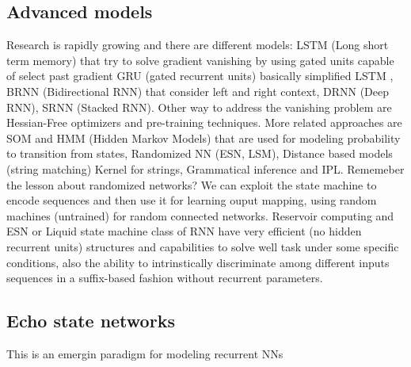 \documentclass[12pt]{book}
\begin{document}
\subsection{Advanced models}
Research is rapidly growing and there are different models: LSTM (Long short term memory) that try to solve gradient vanishing by using gated units capable of select past gradient GRU (gated recurrent units) basically simplified LSTM , BRNN (Bidirectional RNN) that consider left and right context, DRNN (Deep RNN), SRNN (Stacked RNN). Other way to address the vanishing problem are Hessian-Free optimizers and pre-training techniques.\newline
More related approaches are SOM and HMM (Hidden Markov Models) that are used for modeling probability to transition from states, Randomized NN (ESN, LSM), Distance based models (string matching) Kernel for strings, Grammatical inference and IPL.\newline
Rememeber the lesson about randomized networks? We can exploit the state machine to encode sequences and then use it for learning ouput mapping, using random machines (untrained) for random connected networks.\newline
Reservoir computing and ESN or Liquid state machine class of RNN have very efficient (no hidden recurrent units) structures and capabilities to solve well task under some specific conditions, also the ability to intrinstically discriminate among different inputs sequences in a suffix-based fashion without recurrent parameters. 

\clearpage 

\subsection{Echo state networks}
This is an emergin paradigm for modeling recurrent NNs
\end{document}
